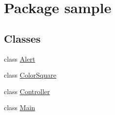 \hypertarget{namespacesample}{}\section{Package sample}
\label{namespacesample}
\subsection*{Classes}
\begin{DoxyCompactItemize}
\item 
class \mbox{\hyperlink{classsample_1_1_alert}{Alert}}
\item 
class \mbox{\hyperlink{classsample_1_1_color_square}{Color\+Square}}
\item 
class \mbox{\hyperlink{classsample_1_1_controller}{Controller}}
\item 
class \mbox{\hyperlink{classsample_1_1_main}{Main}}
\end{DoxyCompactItemize}
